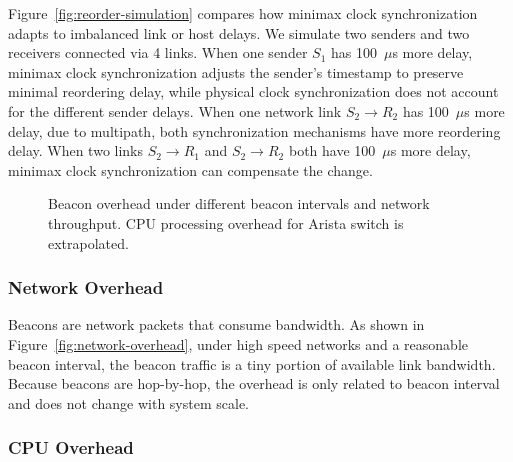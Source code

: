 Figure~\ref{fig:reorder-simulation} compares how minimax clock synchronization adapts to imbalanced link or host delays. We simulate two senders and two receivers connected via 4 links. When one sender $S_1$ has 100~$\mu$s more delay, minimax clock synchronization adjusts the sender's timestamp to preserve minimal reordering delay, while physical clock synchronization does not account for the different sender delays. When one network link $S_2 \rightarrow R_2$ has 100~$\mu$s more delay, due to multipath, both synchronization mechanisms have more reordering delay. When two links $S_2 \rightarrow R_1$ and $S_2 \rightarrow R_2$ both have 100~$\mu$s more delay, minimax clock synchronization can compensate the change.



\begin{figure}[t]
\centering
	\hspace{0.01\textwidth}
\caption{Beacon overhead under different beacon intervals and network throughput. CPU processing overhead for Arista switch is extrapolated.}
\label{fig:overhead}
\end{figure}




\subsubsection{Network Overhead}
\label{sec:eval-overhead}


Beacons are network packets that consume bandwidth.
As shown in Figure~\ref{fig:network-overhead}, under high speed networks and a reasonable beacon interval, the beacon traffic is a tiny portion of available link bandwidth. Because beacons are hop-by-hop, the overhead is only related to beacon interval and does not change with system scale.

\subsubsection{CPU Overhead}
\label{sec:eval-cpu-overhead}

